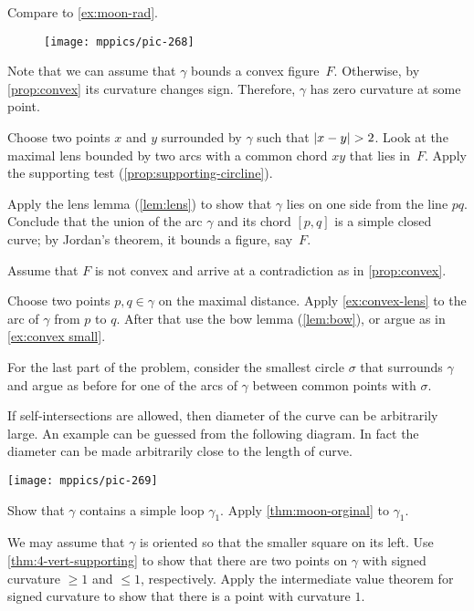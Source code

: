 \begin{multicols}{2}
 Compare to \ref{ex:moon-rad}.

\begin{wrapfigure}{r}{34 mm}
\vskip-6mm
\centering
\texttt{[image: mppics/pic-268]}
\vskip0mm
\end{wrapfigure}

Note that we can assume that $\gamma$ bounds a convex figure~$F$.
Otherwise, by \ref{prop:convex} its curvature changes sign.
Therefore, $\gamma$ has zero curvature at some point.

Choose two points $x$ and $y$ surrounded by $\gamma$ such that $|x\z-y|\z>2$.
Look at the maximal lens bounded by two arcs with a common chord $xy$ that lies in~$F$.
Apply the supporting test (\ref{prop:supporting-circline}).

Apply the lens lemma (\ref{lem:lens}) to show that $\gamma$ lies on one side from the line $pq$.
Conclude that the union of the arc $\gamma$ and its chord $[p,q]$ is a simple closed curve;
by Jordan's theorem, it bounds a figure, say~$F$.

Assume that $F$ is not convex and arrive at a contradiction as in \ref{prop:convex}. 

Choose two points $p,q\in\gamma$ on the maximal distance.
Apply \ref{ex:convex-lens} to the arc of $\gamma$ from $p$ to $q$.
After that use the bow lemma (\ref{lem:bow}), or argue as in \ref{ex:convex small}.

For the last part of the problem, consider the smallest circle $\sigma$ that surrounds $\gamma$ and argue as before for one of the arcs of $\gamma$ between common points with $\sigma$.

If self-intersections are allowed, then diameter of the curve can be arbitrarily large.
An example can be guessed from the following diagram.
In fact the diameter can be made arbitrarily close to the length of curve.
\begin{Figure}
\vskip-0mm
\centering
\texttt{[image: mppics/pic-269]}
\vskip-0mm
\end{Figure}

Show that $\gamma$ contains a simple loop $\gamma_1$.
Apply \ref{thm:moon-orginal} to $\gamma_1$.

We may assume that $\gamma$ is oriented so that the smaller square on its left.
Use \ref{thm:4-vert-supporting} to show that there are two points on $\gamma$ with signed curvature $\ge 1$ and $\le 1$, respectively.
Apply the intermediate value theorem for signed curvature to show that there is a point with curvature $1$.


\end{multicols}
